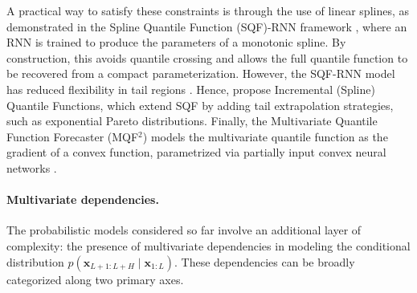 \documentclass[a4paper,oneside,bibliography=totoc]{scrbook}
\begin{document}
A practical way to satisfy these constraints is through the use of linear splines, as demonstrated in the Spline Quantile Function (SQF)-RNN framework \cite{gasthaus_probabilistic_2019}, where an RNN is trained to produce the parameters of a monotonic spline.
By construction, this avoids quantile crossing and allows the full quantile function to be recovered from a compact parameterization.
However, the SQF-RNN model has reduced flexibility in tail regions \cite{park_learning_2022}. 
Hence, \citet{park_learning_2022} propose Incremental (Spline) Quantile Functions, which extend SQF by adding tail extrapolation strategies, such as exponential Pareto distributions.
Finally, the Multivariate Quantile Function Forecaster (MQF$^2$) \cite{kan_multivariate_2022} models the multivariate quantile function as the gradient of a convex function, parametrized via partially input convex neural networks \cite{amos_input_2017, huang_convex_2020}.  



\paragraph{Multivariate dependencies.}
\label{p:multivariate_dep}
The probabilistic models considered so far involve an additional layer of complexity: the presence of multivariate dependencies in modeling the conditional distribution $p(\mathbf{x}_{L+1:L+H} \mid \mathbf{x}_{1:L})$. These dependencies can be broadly categorized along two primary axes.
\end{document}
